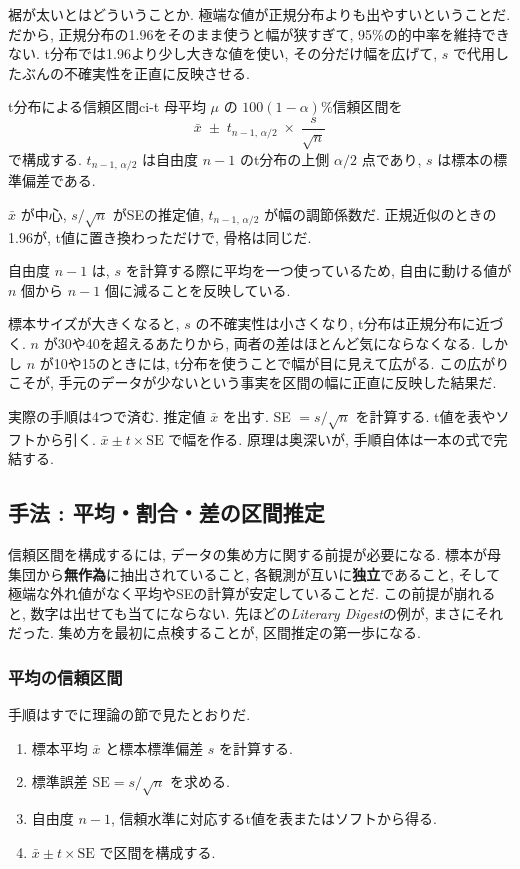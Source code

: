 裾が太いとはどういうことか.
極端な値が正規分布よりも出やすいということだ.
だから, 正規分布の1.96をそのまま使うと幅が狭すぎて, 95\%の的中率を維持できない.
t分布では1.96より少し大きな値を使い, その分だけ幅を広げて, $s$ で代用したぶんの不確実性を正直に反映させる.

\begin{defi}{t分布による信頼区間}{ci-t}
母平均 $\mu$ の $100(1-\alpha)$\%信頼区間を
\[
  \bar{x} \;\pm\; t_{n-1,\,\alpha/2} \;\times\; \frac{s}{\sqrt{n}}
\]
で構成する.
$t_{n-1,\,\alpha/2}$ は自由度 $n-1$ のt分布の上側 $\alpha/2$ 点であり, $s$ は標本の標準偏差である.
\end{defi}

$\bar{x}$ が中心, $s/\sqrt{n}$ がSEの推定値, $t_{n-1,\,\alpha/2}$ が幅の調節係数だ.
正規近似のときの1.96が, t値に置き換わっただけで, 骨格は同じだ.

自由度 $n-1$ は, $s$ を計算する際に平均を一つ使っているため, 自由に動ける値が $n$ 個から $n-1$ 個に減ることを反映している.

標本サイズが大きくなると, $s$ の不確実性は小さくなり, t分布は正規分布に近づく.
$n$ が30や40を超えるあたりから, 両者の差はほとんど気にならなくなる.
しかし $n$ が10や15のときには, t分布を使うことで幅が目に見えて広がる.
この広がりこそが, 手元のデータが少ないという事実を区間の幅に正直に反映した結果だ.

実際の手順は4つで済む.
推定値 $\bar{x}$ を出す.
SE $= s/\sqrt{n}$ を計算する.
t値を表やソフトから引く.
$\bar{x} \pm t \times \mathrm{SE}$ で幅を作る.
原理は奥深いが, 手順自体は一本の式で完結する.


\subsection{手法 : 平均・割合・差の区間推定}

信頼区間を構成するには, データの集め方に関する前提が必要になる.
標本が母集団から\textbf{無作為}に抽出されていること, 各観測が互いに\textbf{独立}であること, そして極端な外れ値がなく平均やSEの計算が安定していることだ.
この前提が崩れると, 数字は出せても当てにならない.
先ほどの\textit{Literary Digest}の例が, まさにそれだった.
集め方を最初に点検することが, 区間推定の第一歩になる.

\subsubsection{平均の信頼区間}

手順はすでに理論の節で見たとおりだ.
\begin{enumerate}
  \item 標本平均 $\bar{x}$ と標本標準偏差 $s$ を計算する.
  \item 標準誤差 $\mathrm{SE} = s / \sqrt{n}$ を求める.
  \item 自由度 $n-1$, 信頼水準に対応するt値を表またはソフトから得る.
  \item $\bar{x} \pm t \times \mathrm{SE}$ で区間を構成する.
\end{enumerate}


